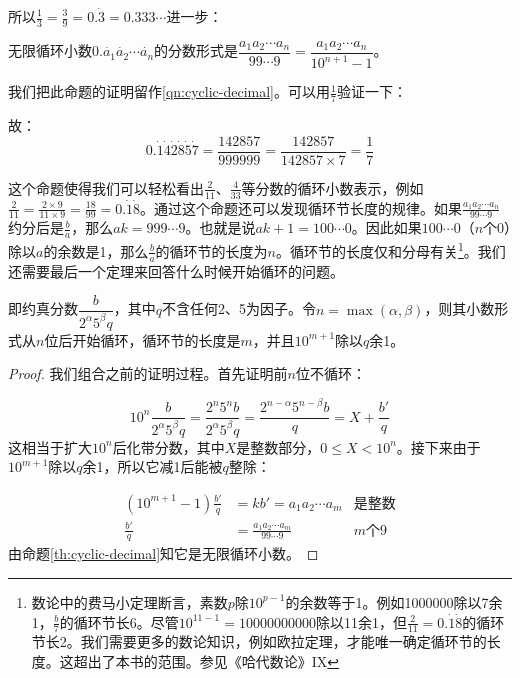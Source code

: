 \documentclass[b5paper]{ctexart}
\begin{document}
所以$\frac{1}{3} = \frac{3}{9} = 0.\dot{3} = 0.333\cdots$进一步：

\begin{proposition} \label{th:cyclic-decimal}
无限循环小数$0.\dot{a_1} \dot{a_2} \cdots \dot{a_n}$的分数形式是$\dfrac{a_1 a_2 \cdots a_n}{99 \cdots 9} = \dfrac{a_1 a_2 \cdots a_n}{10^{n+1} - 1}$。
\end{proposition}

我们把此命题的证明留作\cref{qn:cyclic-decimal}。可以用$\frac{1}{7}$验证一下：

\begin{center}
\end{center}

故：
\[
0.\dot{1}\dot{4}\dot{2}\dot{8}\dot{5}\dot{7} = \frac{142857}{999999} = \frac{142857}{142857 \times 7} = \frac{1}{7}
\]

这个命题使得我们可以轻松看出$\frac{2}{11}$、$\frac{4}{33}$等分数的循环小数表示，例如$\frac{2}{11} = \frac{2 \times 9}{11 \times 9} = \frac{18}{99} = 0.\dot{1}\dot{8}$。通过这个命题还可以发现循环节长度的规律。如果$\frac{a_1 a_2 \cdots a_n}{99 \cdots 9}$约分后是$\frac{b}{a}$，那么$ak = 999 \cdots 9$。也就是说$ak + 1 = 100 \cdots 0$。因此如果$100\cdots 0$（$n$个0）除以$a$的余数是1，那么$\frac{b}{a}$的循环节的长度为$n$。循环节的长度仅和分母有关\footnote{数论中的费马小定理断言，素数$p$除$10^{p-1}$的余数等于1。例如1000000除以7余1，$\frac{b}{7}$的循环节长6。尽管$10^{11-1} = 10000000000$除以11余1，但$\frac{2}{11} = 0.\dot{1}\dot{8}$的循环节长2。我们需要更多的数论知识，例如欧拉定理，才能唯一确定循环节的长度。这超出了本书的范围。参见《哈代数论》IX}。我们还需要最后一个定理来回答什么时候开始循环的问题。

\begin{theorem}
即约真分数$\dfrac{b}{2^{\alpha} 5^{\beta} q}$，其中$q$不含任何2、5为因子。令$n = \max(\alpha, \beta)$，则其小数形式从$n$位后开始循环，循环节的长度是$m$，并且$10^{m+1}$除以$q$余1。
\end{theorem}

\begin{proof}
我们组合之前的证明过程。首先证明前$n$位不循环：

\[
10^n \frac{b}{2^{\alpha} 5^{\beta} q} = \frac{2^n 5^n b}{2^{\alpha} 5^{\beta} q} = \frac{2^{n - \alpha} 5^{n - \beta} b}{q} = X + \frac{b'}{q}
\]
这相当于扩大$10^n$后化带分数，其中$X$是整数部分，$0 \leq X < 10^n$。接下来由于$10^{m+1}$除以$q$余1，所以它减1后能被$q$整除：

\begin{align*}
  (10^{m+1} - 1) \frac{b'}{q} &= k b' = a_1 a_2 \cdots a_m & \text{是整数}\\
                \frac{b'}{q} &= \frac{a_1 a_2 \cdots a_m}{99\cdots9} & m\text{个}9
\end{align*}
由命题\ref{th:cyclic-decimal}知它是无限循环小数。
\end{proof}
\end{document}
